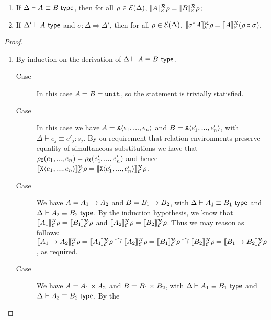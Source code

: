 \begin{restateLemma}
  \begin{enumerate}
  \item If $\Delta \vdash A \equiv B \textsf{ type}$, then for all $\rho \in
    \mathcal{E}(\Delta)$, $\llbracket A \rrbracket^{\mathcal{R}}_{\mathcal{E}}{\rho} =
    \llbracket B \rrbracket^{\mathcal{R}}_{\mathcal{E}}{\rho}$;
  \item If $\Delta' \vdash A \textsf{ type}$ and $\sigma : \Delta \Rightarrow
    \Delta'$, then for all $\rho \in \mathcal{E}(\Delta)$,
    $\llbracket \sigma^*A \rrbracket^{\mathcal{R}}_{\mathcal{E}}{\rho} = \llbracket A \rrbracket^{\mathcal{R}}_{\mathcal{E}}{(}\rho
    \circ \sigma)$.
  \end{enumerate}
\end{restateLemma}
\begin{proof}
  \begin{enumerate}
  \item By induction on the derivation of $\Delta \vdash A \equiv B
    \textsf{ type}$.
    \begin{description}
    \item[Case ] In this case $A = B = \texttt{unit}$, so
      the statement is trivially statisfied.
    \item[Case ] In this case we have $A =
      \texttt{X}\langle e_1,...,e_n \rangle$ and $B = \texttt{X}\langle e'_1,...,e'_n \rangle$,
      with $\Delta \vdash e_j \equiv e'_j : s_j$. By ou requirement
      that relation environments preserve equality of simultaneous
      substitutions we have that $\rho_{\texttt{X}}(e_1,...,e_n) =
      \rho_{\texttt{X}}(e'_1,...,e'_n)$ and hence
      $\llbracket \texttt{X}\langle e_1,...,e_n \rangle \rrbracket^{\mathcal{R}}_{\mathcal{E}}{\rho} =
      \llbracket \texttt{X}\langle e'_1,...,e'_n \rangle \rrbracket^{\mathcal{R}}_{\mathcal{E}}{\rho}$.
    \item[Case ] We have $A = A_1 \to A_2$ and $B
      = B_1 \to B_2$, with $\Delta \vdash A_1 \equiv B_1 \textsf{ type}$
      and $\Delta \vdash A_2 \equiv B_2 \textsf{ type}$. By the induction
      hypothesis, we know that $\llbracket A_1 \rrbracket^{\mathcal{R}}_{\mathcal{E}}{\rho} =
      \llbracket B_1 \rrbracket^{\mathcal{R}}_{\mathcal{E}}{\rho}$ and $\llbracket A_2 \rrbracket^{\mathcal{R}}_{\mathcal{E}}{\rho} =
      \llbracket B_2 \rrbracket^{\mathcal{R}}_{\mathcal{E}}{\rho}$. Thus we may reason as follows:
      $\llbracket A_1 \to A_2 \rrbracket^{\mathcal{R}}_{\mathcal{E}}{\rho} =
      \llbracket A_1 \rrbracket^{\mathcal{R}}_{\mathcal{E}}{\rho} \mathrel{\widehat\to} \llbracket A_2 \rrbracket^{\mathcal{R}}_{\mathcal{E}}{\rho}
      = \llbracket B_1 \rrbracket^{\mathcal{R}}_{\mathcal{E}}{\rho} \mathrel{\widehat\to}
      \llbracket B_2 \rrbracket^{\mathcal{R}}_{\mathcal{E}}{\rho} = \llbracket B_1 \to
        B_2 \rrbracket^{\mathcal{R}}_{\mathcal{E}}{\rho}$, as required.
    \item[Case ] We have $A = A_1 \times A_2$
      and $B = B_1 \times B_2$, with $\Delta \vdash A_1 \equiv B_1
      \textsf{ type}$ and $\Delta \vdash A_2 \equiv B_2 \textsf{ type}$. By the

\end{description}
\end{enumerate}
\end{proof}
